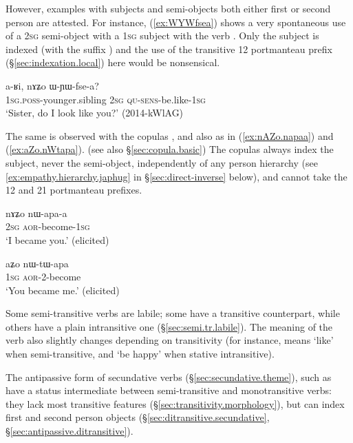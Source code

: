 However, examples with subjects and semi-objects both either first or second person are attested. For instance, (\ref{ex:WYWfsea}) shows a very spontaneous use of a \textsc{2sg} semi-object with a \textsc{1sg} subject with the verb . Only the subject is indexed (with the suffix ) and the use of the transitive  1\fl{}2 portmanteau prefix (§\ref{sec:indexation.local}) here would be nonsensical. 

\begin{exe}
\ex \label{ex:WYWfsea}
\gll a-ʁi, nɤʑo ɯ-ɲɯ-fse-a? \\
\textsc{1sg}.\textsc{poss}-younger.sibling \textsc{2sg} \textsc{qu}-\textsc{sens}-be.like-\textsc{1sg} \\
\glt `Sister, do I look like you?' (2014-kWlAG)
\end{exe}

The same is observed with the copulas ,   and also  as in (\ref{ex:nAZo.napaa}) and (\ref{ex:aZo.nWtapa}). (see also §\ref{sec:copula.basic}) The copulas always index the subject, never the semi-object, independently of any person hierarchy (see \ref{ex:empathy.hierarchy.japhug} in §\ref{sec:direct-inverse} below), and cannot take the  1\fl{}2  and  2\fl{}1 portmanteau prefixes.

 
\begin{exe}
\ex \label{ex:nAZo.napaa}
\gll nɤʑo nɯ-apa-a \\
\textsc{2sg} \textsc{aor}-become-\textsc{1sg} \\
\glt `I became you.' (elicited)
\end{exe}

\begin{exe}
\ex \label{ex:aZo.nWtapa}
\gll aʑo nɯ-tɯ-apa \\
\textsc{1sg} \textsc{aor}-2-become \\
\glt `You became me.' (elicited)
\end{exe}

Some semi-transitive verbs are labile; some have a transitive counterpart, while others have a plain intransitive one (§\ref{sec:semi.tr.labile}). The meaning of the verb also slightly changes depending on transitivity (for instance,  means `like' when semi-transitive, and `be happy' when stative intransitive).
  
The antipassive form of secundative verbs (§\ref{sec:secundative.theme}), such as  have a status intermediate between semi-transitive and monotransitive verbs: they lack most transitive features (§\ref{sec:transitivity.morphology}), but can index first and second person objects (§\ref{sec:ditransitive.secundative}, §\ref{sec:antipassive.ditransitive}).

